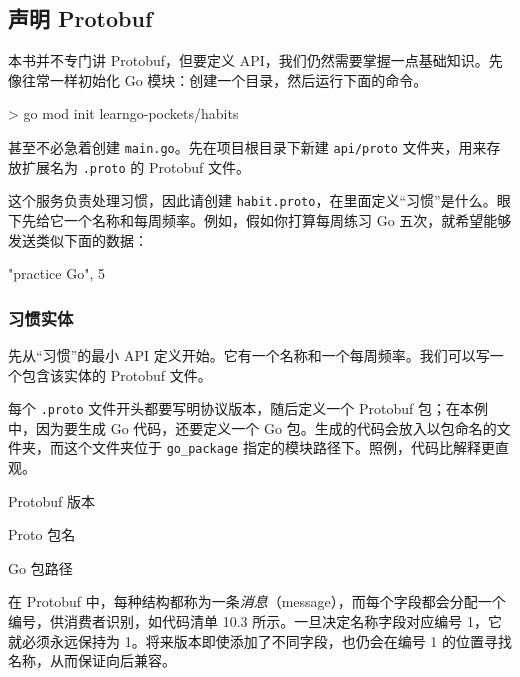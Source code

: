 \subsection{声明 Protobuf}

本书并不专门讲 Protobuf，但要定义 API，我们仍然需要掌握一点基础知识。先像往常一样初始化 Go 模块：创建一个目录，然后运行下面的命令。

\begin{shellcode}[]
> go mod init learngo-pockets/habits
\end{shellcode}

甚至不必急着创建 \texttt{main.go}。先在项目根目录下新建 \texttt{api/proto} 文件夹，用来存放扩展名为 \texttt{.proto} 的 Protobuf 文件。

这个服务负责处理习惯，因此请创建 \texttt{habit.proto}，在里面定义“习惯”是什么。眼下先给它一个名称和每周频率。例如，假如你打算每周练习 Go 五次，就希望能够发送类似下面的数据：

\begin{plaincode}[]
{"practice Go", 5}
\end{plaincode}

\subsubsection{习惯实体}

先从“习惯”的最小 API 定义开始。它有一个名称和一个每周频率。我们可以写一个包含该实体的 Protobuf 文件。

每个 \texttt{.proto} 文件开头都要写明协议版本，随后定义一个 Protobuf 包；在本例中，因为要生成 Go 代码，还要定义一个 Go 包。生成的代码会放入以包命名的文件夹，而这个文件夹位于 \texttt{go\_package} 指定的模块路径下。照例，代码比解释更直观。


\begin{codeannotations}
\item Protobuf 版本
\item Proto 包名
\item Go 包路径
\end{codeannotations}

在 Protobuf 中，每种结构都称为一条\emph{消息}（message），而每个字段都会分配一个编号，供消费者识别，如代码清单 10.3 所示。一旦决定名称字段对应编号 1，它就必须永远保持为 1。将来版本即使添加了不同字段，也仍会在编号 1 的位置寻找名称，从而保证向后兼容。

